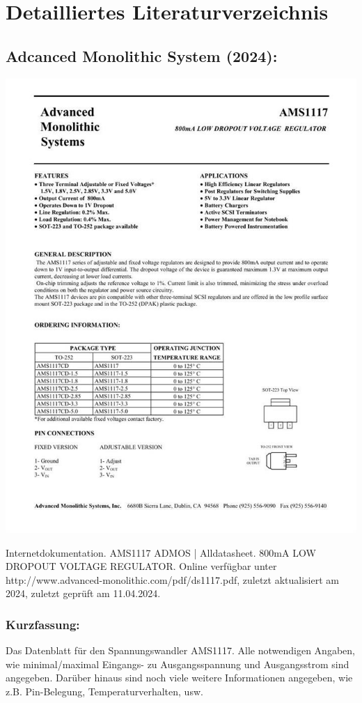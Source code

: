 %
%

\chapter{Detailliertes Literaturverzeichnis}
\section*{Adcanced Monolithic System (2024):}
\begin{minipage}{0.5\textwidth}
	\includegraphics[width=\linewidth]{../Appendix/Literaturverzeichnis/img/AMS.jpg}
\end{minipage}
\hfill
\begin{minipage}{0.48\textwidth}
Internetdokumentation. AMS1117 ADMOS | Alldatasheet. 800mA LOW DROPOUT VOLTAGE REGULATOR.
Online verfügbar unter http://www.advanced-monolithic.com/pdf/ds1117.pdf, zuletzt aktualisiert am 2024, zuletzt geprüft am 11.04.2024.
\subsection*{Kurzfassung:}
Das Datenblatt für den Spannungswandler AMS1117. Alle notwendigen Angaben, wie minimal/maximal Eingangs- zu Ausgangsspannung und Ausgangsstrom sind angegeben. Darüber hinaus sind noch viele weitere Informationen angegeben, wie z.B. Pin-Belegung, Temperaturverhalten, usw.
\end{minipage}
